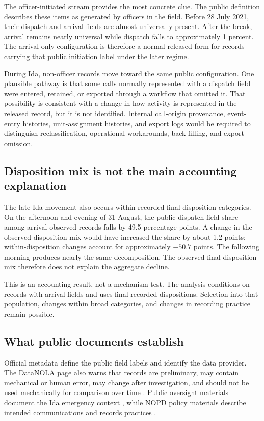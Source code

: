 \documentclass[11pt]{article}
\begin{document}
The officer-initiated stream provides the most concrete clue. The public definition describes these items as generated by officers in the field. Before 28 July 2021, their dispatch and arrival fields are almost universally present. After the break, arrival remains nearly universal while dispatch falls to approximately 1 percent. The arrival-only configuration is therefore a normal released form for records carrying that public initiation label under the later regime.

During Ida, non-officer records move toward the same public configuration. One plausible pathway is that some calls normally represented with a dispatch field were entered, retained, or exported through a workflow that omitted it. That possibility is consistent with a change in how activity is represented in the released record, but it is not identified. Internal call-origin provenance, event-entry histories, unit-assignment histories, and export logs would be required to distinguish reclassification, operational workarounds, back-filling, and export omission.

\subsection{Disposition mix is not the main accounting explanation}

The late Ida movement also occurs within recorded final-disposition categories. On the afternoon and evening of 31 August, the public dispatch-field share among arrival-observed records falls by 49.5 percentage points. A change in the observed disposition mix would have increased the share by about 1.2 points; within-disposition changes account for approximately $-50.7$ points. The following morning produces nearly the same decomposition. The observed final-disposition mix therefore does not explain the aggregate decline.

This is an accounting result, not a mechanism test. The analysis conditions on records with arrival fields and uses final recorded dispositions. Selection into that population, changes within broad categories, and changes in recording practice remain possible.

\subsection{What public documents establish}

Official metadata define the public field labels and identify the data provider. The DataNOLA page also warns that records are preliminary, may contain mechanical or human error, may change after investigation, and should not be used mechanically for comparison over time \citep{DataNOLA2021}. Public oversight materials document the Ida emergency context \citep{OIPM2021}, while NOPD policy materials describe intended communications and records practices \citep{NOPDPolicies2023}.
\end{document}
